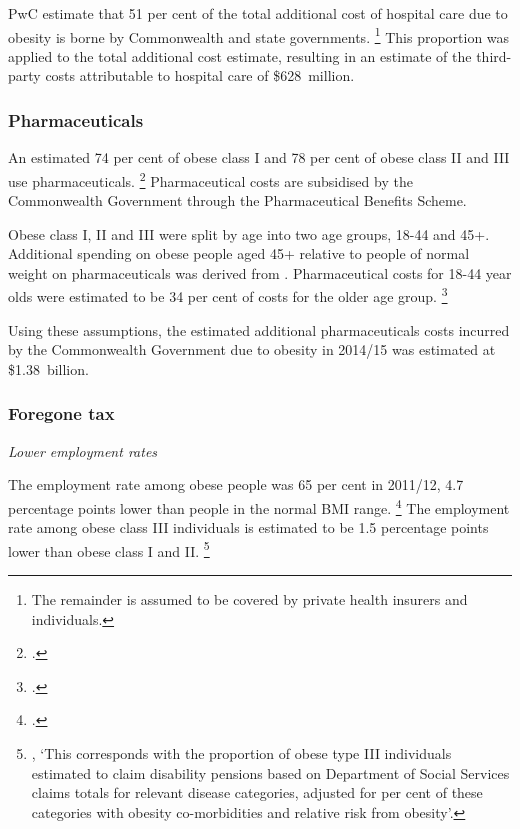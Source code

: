 \documentclass[embargoed]{grattan}
\begin{document}
PwC estimate that 51 per cent of the total additional cost of hospital care due to obesity is borne by Commonwealth and state governments.%
\footnote{The remainder is assumed to be covered by private health insurers and individuals.} This proportion was applied to the total additional cost estimate, resulting in an estimate of the third-party costs attributable to hospital care of \$628~million.

\subsubsection{Pharmaceuticals }\label{pharmaceuticals}

An estimated 74 per cent of obese class I and 78 per cent of obese class II and III use pharmaceuticals.%
\footcite{Buchmueller2015Obesityhealthexpenditures} Pharmaceutical costs are subsidised by the Commonwealth Government through the Pharmaceutical Benefits Scheme.

Obese class I, II and III were split by age into two age groups, 18-44 and 45+.
Additional spending on obese people aged 45+ relative to people of normal weight on pharmaceuticals was derived from \textcite{Buchmueller2015Obesityhealthexpenditures}.
Pharmaceutical costs for 18-44 year olds were estimated to be 34 per cent of costs for the older age group.%
\footcite[][50]{PwC2015Weighingcostobesity}

Using these assumptions, the estimated additional pharmaceuticals costs incurred by the Commonwealth Government due to obesity in 2014/15 was estimated at \$1.38~billion.

\subsubsection{Foregone tax}\label{foregone-tax}

\emph{Lower employment rates}

The employment rate among obese people was 65 per cent in 2011/12, 4.7 percentage points lower than people in the normal BMI range.%
\footcite{ABS2013436405503AustralianHealth} The employment rate among obese class III individuals is estimated to be 1.5 percentage points lower than obese class I and II.%
\footnote{\textcite[][59]{PwC2015Weighingcostobesity}, `This corresponds with the proportion of obese type III individuals estimated to claim disability pensions based on Department of Social Services claims totals for relevant disease categories, adjusted for per cent of these categories with obesity co-morbidities and relative risk from obesity'.}
\end{document}
